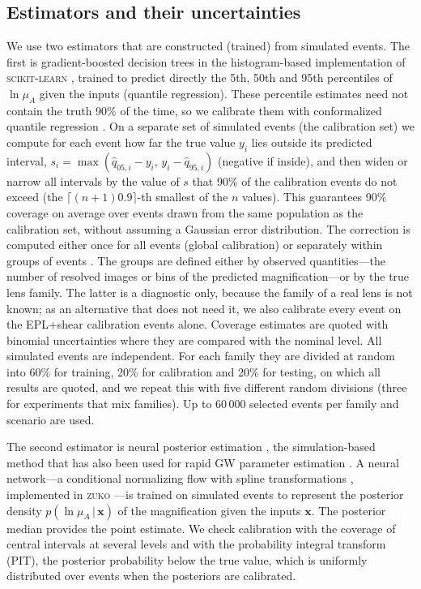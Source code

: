 \subsection{Estimators and their uncertainties}
We use two estimators that are constructed (trained) from simulated events. The first is gradient-boosted decision trees in the histogram-based implementation of \textsc{scikit-learn} \citep[hereafter HistGB;][]{pedregosa2011scikit}, trained to predict directly the 5th, 50th and 95th percentiles of $\ln\mu_A$ given the inputs (quantile regression). These percentile estimates need not contain the truth 90\% of the time, so we calibrate them with conformalized quantile regression \citep[CQR;][]{romano2019cqr}. On a separate set of simulated events (the calibration set) we compute for each event how far the true value $y_i$ lies outside its predicted interval, $s_i=\max(\hat q_{05,i}-y_i,\,y_i-\hat q_{95,i})$ (negative if inside), and then widen or narrow all intervals by the value of $s$ that 90\% of the calibration events do not exceed (the $\lceil(n+1)0.9\rceil$-th smallest of the $n$ values). This guarantees 90\% coverage on average over events drawn from the same population as the calibration set, without assuming a Gaussian error distribution. The correction is computed either once for all events (global calibration) or separately within groups of events \citep{vovk2005algorithmic}. The groups are defined either by observed quantities---the number of resolved images or bins of the predicted magnification---or by the true lens family. The latter is a diagnostic only, because the family of a real lens is not known; as an alternative that does not need it, we also calibrate every event on the EPL+shear calibration events alone. Coverage estimates are quoted with binomial uncertainties where they are compared with the nominal level. All simulated events are independent. For each family they are divided at random into 60\% for training, 20\% for calibration and 20\% for testing, on which all results are quoted, and we repeat this with five different random divisions (three for experiments that mix families). Up to 60\,000 selected events per family and scenario are used.

The second estimator is neural posterior estimation \citep[NPE;][]{papamakarios2016fast}, the simulation-based method that has also been used for rapid GW parameter estimation \citep{dax2021neuralposterior}. A neural network---a conditional normalizing flow with spline transformations \citep{durkan2019nsf}, implemented in \textsc{zuko} \citep{rozet2022zuko}---is trained on simulated events to represent the posterior density $p(\ln\mu_A\,|\,\boldsymbol x)$ of the magnification given the inputs $\boldsymbol x$. The posterior median provides the point estimate. We check calibration with the coverage of central intervals at several levels and with the probability integral transform (PIT), the posterior probability below the true value, which is uniformly distributed over events when the posteriors are calibrated.

